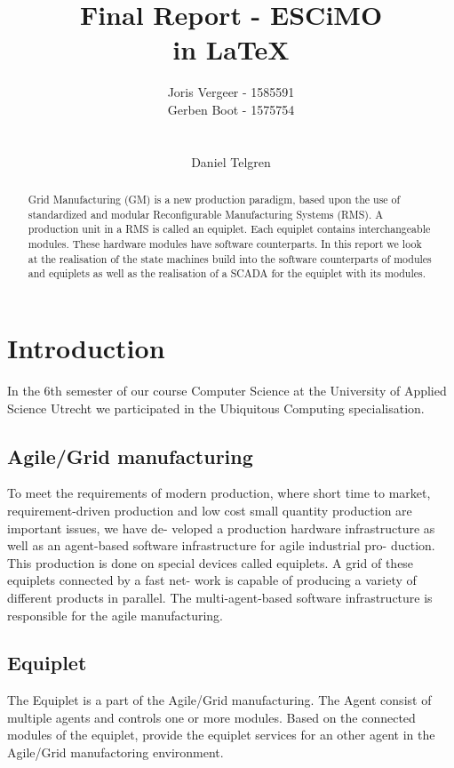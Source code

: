 \documentclass[12pt,a4paper]{report}
\title{
Final Report - ESCiMO \\
in \LaTeX{}
}
\author{
Joris Vergeer - 1585591\\
Gerben Boot - 1575754\\
\\
\\
Daniel Telgren
}
\begin{document}
\maketitle

\begin{abstract}
Grid Manufacturing (GM) is a new production paradigm, based upon the use of standardized and modular Reconfigurable Manufacturing Systems (RMS).\cite{SICE13}
A production unit in a RMS is called an equiplet.
Each equiplet contains interchangeable modules. 
These hardware modules have software counterparts.
In this report we look at the realisation of the state machines build into the software counterparts of modules and equiplets as well as the realisation of a SCADA for the equiplet with its modules.
\end{abstract}

\tableofcontents

\chapter{Introduction}
In the 6th semester of our course Computer Science at the University of Applied Science Utrecht we participated in the Ubiquitous Computing specialisation.

\section{Agile/Grid manufacturing}
To meet the requirements of modern production, where short
time to market, requirement-driven production and low cost
small quantity production are important issues, we have de-
veloped a production hardware infrastructure as well as an
agent-based software infrastructure for agile industrial pro-
duction. This production is done on special devices called
equiplets. A grid of these equiplets connected by a fast net-
work is capable of producing a variety of different products
in parallel. The multi-agent-based software infrastructure is
responsible for the agile manufacturing.\cite{Paper70}

\section{Equiplet}
The Equiplet is a part of the Agile/Grid manufacturing. The Agent consist of multiple agents and controls one or more modules. Based on the connected modules of the equiplet, provide the equiplet services for an other agent in the Agile/Grid manufactoring environment. 
\end{document}
